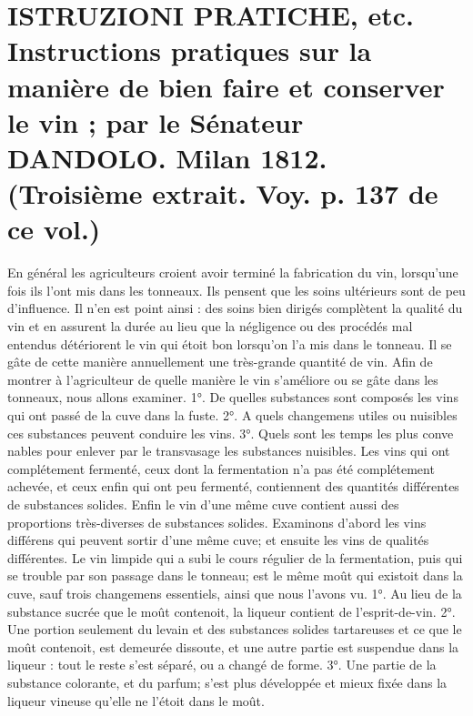 \setcounter{page}{315}
\section{ISTRUZIONI PRATICHE, etc. Instructions pratiques sur la manière de bien faire et conserver le vin ; par le Sénateur DANDOLO. Milan 1812. \large{(Troisième extrait. Voy. p. 137 de ce vol.)}}
En général les agriculteurs croient avoir terminé la fabrication du vin, lorsqu'une fois ils l'ont mis dans les tonneaux. Ils pensent que les soins ultérieurs sont de peu d'influence. Il n'en est point ainsi : des soins bien dirigés complètent la qualité du vin et en assurent la durée au lieu que la négligence ou des procédés mal entendus détériorent le vin qui étoit bon lorsqu'on l'a mis dans le tonneau. Il se gâte de cette manière annuellement une très-grande quantité de vin.
Afin de montrer à l'agriculteur de quelle manière le vin s'améliore ou se gâte dans les tonneaux, nous allons examiner.
1°. De quelles substances sont composés les vins qui ont passé de la cuve dans la fuste.
2°. A quels changemens utiles ou nuisibles ces substances peuvent conduire les vins.
3°. Quels sont les temps les plus conve\setcounter{page}{316} nables pour enlever par le transvasage les substances nuisibles.
Les vins qui ont complétement fermenté, ceux dont la fermentation n'a pas été complétement achevée, et ceux enfin qui ont peu fermenté, contiennent des quantités différentes de substances solides. Enfin le vin d'une même cuve contient aussi des proportions très-diverses de substances solides. Examinons d'abord les vins différens qui peuvent sortir d'une même cuve; et ensuite les vins de qualités différentes.
Le vin limpide qui a subi le cours régulier de la fermentation, puis qui se trouble par son passage dans le tonneau; est le même moût qui existoit dans la cuve, sauf trois changemens essentiels, ainsi que nous l'avons vu. 1°. Au lieu de la substance sucrée que le moût contenoit, la liqueur contient de l'esprit-de-vin. 2°. Une portion seulement du levain et des substances solides tartareuses et ce que le moût contenoit, est demeurée dissoute, et une autre partie est suspendue dans la liqueur : tout le reste s'est séparé, ou a changé de forme. 3°. Une partie de la substance colorante, et du parfum; s'est plus développée et mieux fixée dans la liqueur vineuse qu'elle ne l'étoit dans le moût.
